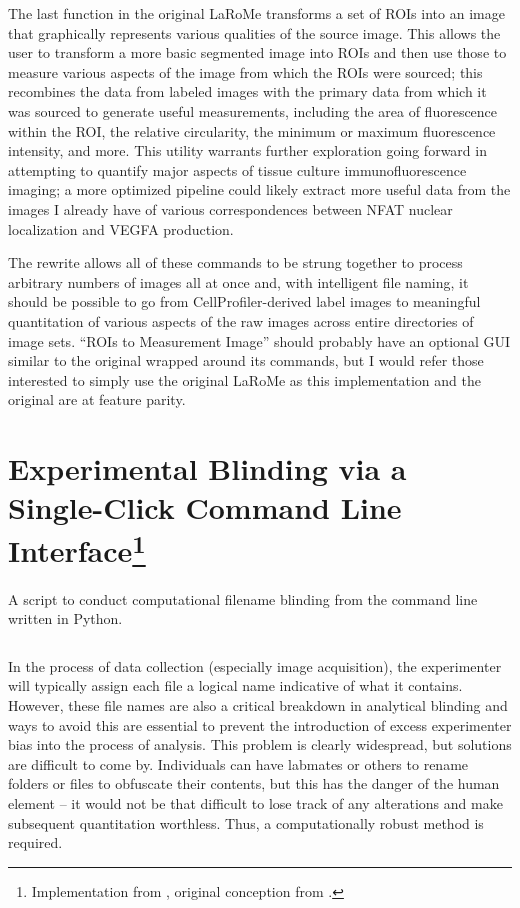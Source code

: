 The last function in the original LaRoMe transforms a set of ROIs into an image that graphically represents various qualities of the source image. This allows the user to transform a more basic segmented image into ROIs and then use those to measure various aspects of the image from which the ROIs were sourced; this recombines the data from labeled images with the primary data from which it was sourced to generate useful measurements, including the area of fluorescence within the ROI, the relative circularity, the minimum or maximum fluorescence intensity, and more. This utility warrants further exploration going forward in attempting to quantify major aspects of tissue culture immunofluorescence imaging; a more optimized pipeline could likely extract more useful data from the images I already have of various correspondences between NFAT nuclear localization and VEGFA production.

The rewrite allows all of these commands to be strung together to process arbitrary numbers of images all at once and, with intelligent file naming, it should be possible to go from CellProfiler\hyp{}derived label images to meaningful quantitation of various aspects of the raw images across entire directories of image sets. ``ROIs to Measurement Image'' should probably have an optional GUI similar to the original wrapped around its commands, but I would refer those interested to simply use the original LaRoMe as this implementation and the original are at feature parity.

\section[Experimental Blinding via a Single\hyp{}Click Command Line Interface]{Experimental Blinding via a Single\hyp{}Click Command Line Interface\footnote{Implementation from , original conception from \cite{Salter2016}.}}\label{blinders}

\begin{code}
\caption{A script to conduct computational filename blinding from the command line written in Python.}
\label{blinder}

\inputminted[breaklines,frame=single,fontsize=\small]{python}{source/renamer.py}

\end{code}

In the process of data collection (especially image acquisition), the experimenter will typically assign each file a logical name indicative of what it contains. However, these file names are also a critical breakdown in analytical blinding and ways to avoid this are essential to prevent the introduction of excess experimenter bias into the process of analysis. This problem is clearly widespread, but solutions are difficult to come by. Individuals can have labmates or others to rename folders or files to obfuscate their contents, but this has the danger of the human element -- it would not be that difficult to lose track of any alterations and make subsequent quantitation worthless. Thus, a computationally robust method is required. 

